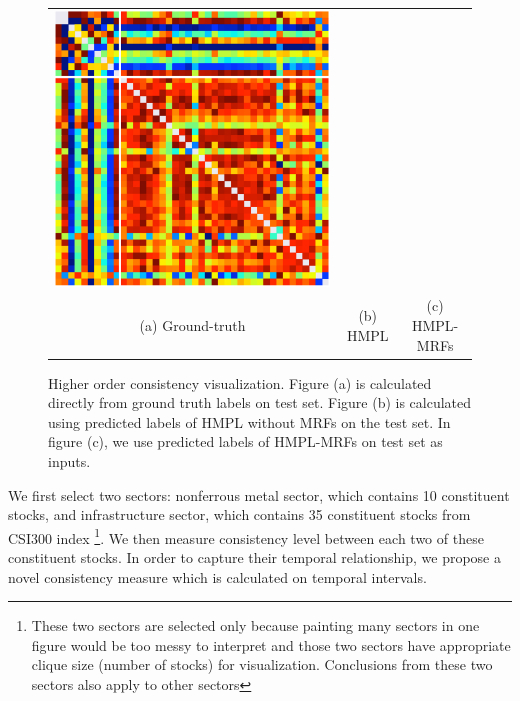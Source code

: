 \documentclass[sigconf,anonymous,review]{acmart}
\begin{document}
\begin{figure}[t]
\begin{tabular}{ccc}
    \includegraphics[width=0.45\columnwidth]{Methodology/figures/mrf.png}
\\                                                                        {\small (a) Ground-truth} & {\small (b) HMPL } & {\small (c) HMPL-MRFs} 
  \end{tabular}\vspace{-2mm}
  \caption{\label{fig:consistency} Higher order consistency
    visualization. Figure (a) is calculated
    directly from ground truth labels on test set.
    Figure (b)
    is calculated using predicted labels of HMPL without MRFs on the
    test set.
    In figure (c), we use predicted labels of
    HMPL-MRFs on test set as inputs.}\vspace{0mm}
\end{figure}

We first select two sectors: nonferrous metal sector, which
contains 10 constituent stocks, and infrastructure sector, which
contains 35 constituent stocks from CSI300 index \footnote{These
  two sectors are selected only because painting many sectors in
  one figure would be too messy to interpret and those two
  sectors have appropriate clique size (number of stocks) for
  visualization. Conclusions from these two sectors also apply to
  other sectors}. We then measure consistency level between each
two of these constituent stocks. In order to capture their
temporal relationship, we propose a novel consistency measure
which is calculated on temporal intervals.
\end{document}
